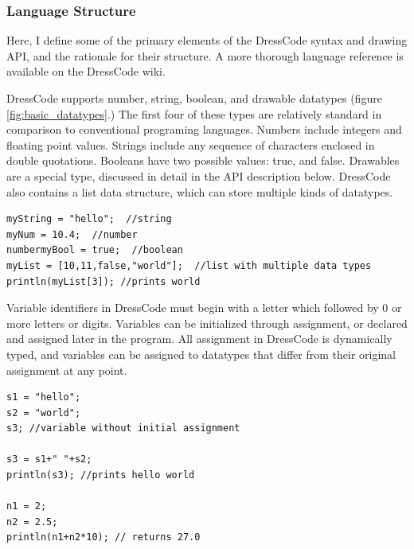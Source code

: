 \subsubsection{Language Structure}
Here, I define some of the primary elements of the DressCode syntax and drawing API, and the rationale for their structure. A more thorough language reference is available on the DressCode wiki\cite{DressCodeWiki}.

 DressCode supports number, string, boolean, and drawable datatypes (figure \ref{fig:basic_datatypes}.) The first four of these types are relatively standard in comparison to conventional programing languages. Numbers include integers and floating point values. Strings include any sequence of characters enclosed in double quotations. Booleans have two possible values: true, and false. Drawables are a special type, discussed in detail in the API description below. DressCode also contains a list data structure, which can store multiple kinds of datatypes.
\begin{center}
\begin{lstlisting}
myString = "hello";  //string
myNum = 10.4;  //number
numbermyBool = true;  //boolean
myList = [10,11,false,"world"];  //list with multiple data types
println(myList[3]); //prints world
\end{lstlisting}
\end{center}

Variable identifiers in DressCode must begin with a letter which followed by 0 or more letters or digits. Variables can be initialized through assignment, or declared and assigned later in the program. All assignment in DressCode is dynamically typed, and variables can be assigned to datatypes that differ from their original assignment at any point. %

\begin{center}
\begin{lstlisting}
s1 = "hello";
s2 = "world";
s3; //variable without initial assignment

s3 = s1+" "+s2; 
println(s3); //prints hello world

n1 = 2;
n2 = 2.5;
println(n1+n2*10); // returns 27.0
\end{lstlisting}
\end{center}


